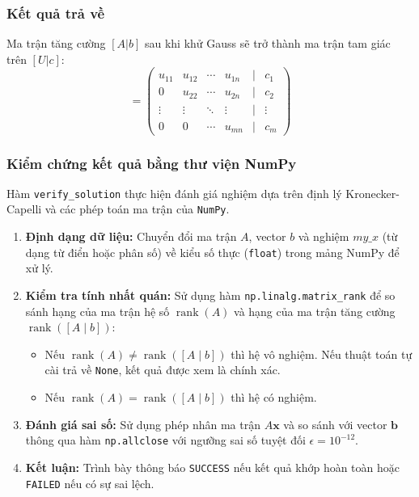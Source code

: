 \documentclass[12pt,a4paper]{article}
\begin{document}
\subsubsection{Kết quả trả về}
\begin{infobox}
Ma trận tăng cường $[A | b]$ sau khi khử Gauss sẽ trở thành ma trận tam giác trên $[U | c]$:
\begin{equation}
[U | c] = \begin{pmatrix}
u_{11} & u_{12} & \cdots & u_{1n} & | & c_1 \\
0      & u_{22} & \cdots & u_{2n} & | & c_2 \\
\vdots & \vdots & \ddots & \vdots & | & \vdots \\
0      & 0      & \cdots & u_{mn} & | & c_m
\end{pmatrix}
\end{equation}
\end{infobox}

\subsubsection{Kiểm chứng kết quả bằng thư viện NumPy}
Hàm \texttt{verify\_solution} thực hiện đánh giá nghiệm dựa trên định lý Kronecker-Capelli và các phép toán ma trận của \texttt{NumPy}.

\begin{enumerate}[label=\textbf{\alph*)}, leftmargin=*, align=left]
\item \textbf{Định dạng dữ liệu:} Chuyển đổi ma trận $A$, vector $b$ và nghiệm $my\_x$ (từ dạng từ điển hoặc phân số) về kiểu số thực (\texttt{float}) trong mảng NumPy để xử lý.

\item \textbf{Kiểm tra tính nhất quán:} Sử dụng hàm \texttt{np.linalg.matrix\_rank} để so sánh hạng của ma trận hệ số $\operatorname{rank}(A)$ và hạng của ma trận tăng cường $\operatorname{rank}([A\mid b])$:
\begin{itemize}[leftmargin=*]
    \item Nếu $\operatorname{rank}(A) \ne \operatorname{rank}([A\mid b])$ thì hệ vô nghiệm. Nếu thuật toán tự cài trả về \texttt{None}, kết quả được xem là chính xác.
    \item Nếu $\operatorname{rank}(A) = \operatorname{rank}([A\mid b])$ thì hệ có nghiệm.
\end{itemize}

\item \textbf{Đánh giá sai số:} Sử dụng phép nhân ma trận $A\mathbf{x}$ và so sánh với vector $\mathbf{b}$ thông qua hàm \texttt{np.allclose} với ngưỡng sai số tuyệt đối $\epsilon = 10^{-12}$.

\item \textbf{Kết luận:} Trình bày thông báo \texttt{SUCCESS} nếu kết quả khớp hoàn toàn hoặc \texttt{FAILED} nếu có sự sai lệch.
\end{enumerate}
\end{document}

